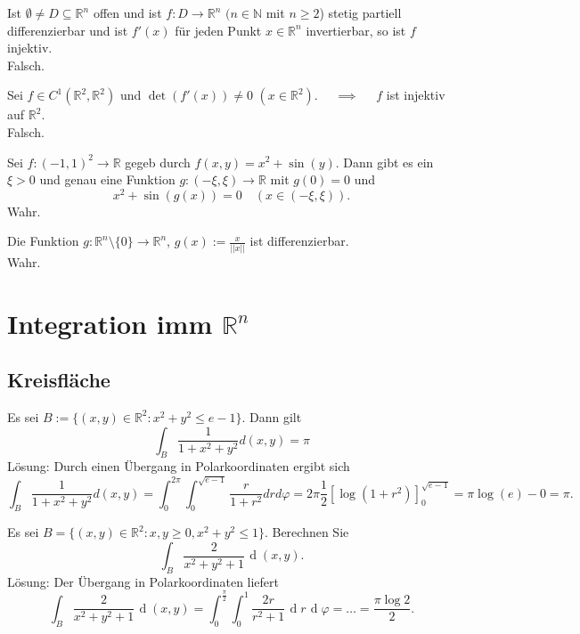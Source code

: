 \documentclass[parskip=full]{scrartcl}
\DeclareMathOperator{\diff}{\mathop{}\!\mathrm{d}}
\begin{document}
Ist $\emptyset \neq D \subseteq \mathbb{R}^n$ offen und ist $f : D \to \mathbb{R}^n$ $(n \in \mathbb{N}$ mit $n \geq 2$) stetig partiell differenzierbar und ist $f'(x)$ für jeden Punkt $x \in \mathbb{R}^n$ invertierbar, so ist $f$ injektiv.\\
Falsch.

Sei $f \in C^1(\mathbb{R}^2, \mathbb{R}^2)$ und $\det(f'(x)) \neq 0$ $(x \in \mathbb{R}^2)$. $\quad \implies \quad$ $f$ ist injektiv auf $\mathbb{R}^2$.\\
Falsch.

Sei $f : (-1,1)^2 \to \mathbb{R}$ gegeb durch $f(x,y) = x^2 + \sin(y)$.
Dann gibt es ein $\xi > 0$ und genau eine Funktion $g : (-\xi, \xi) \to \mathbb{R}$ mit $g(0) = 0$ und
\begin{displaymath}
  x^2 + \sin(g(x)) = 0 \quad (x \in (-\xi, \xi)).
\end{displaymath}
Wahr.

Die Funktion $g : \mathbb{R}^n \setminus \{0\} \to \mathbb{R}^n$, $g(x) := \frac{x}{||x||}$ ist differenzierbar.\\
Wahr.

\section{Integration imm $\mathbb{R}^n$}
\subsection{Kreisfläche}
Es sei $B:= \{(x,y) \in \mathbb{R}^2 : x^2 + y^2 \leq e - 1\}$.
Dann gilt
\begin{displaymath}
  \int_{B} \frac{1}{1 + x^2 + y^2}d(x,y) = \pi
\end{displaymath}
Lösung:
Durch einen Übergang in Polarkoordinaten ergibt sich
\begin{displaymath}
  \int_{B} \frac{1}{1 + x^2 + y^2} d(x,y) = \int_{0}^{2\pi} \int_{0}^{\sqrt{e - 1}} \frac{r}{1 + r^2} drd\varphi = 2\pi \frac{1}{2}[\log(1 + r^2)]_{0}^{\sqrt{e-1}} = \pi \log(e) - 0 = \pi.
\end{displaymath}

Es sei $B = \{(x,y) \in \mathbb{R}^2 : x,y \geq 0, x^2 + y^2 \leq 1\}$.
Berechnen Sie
\begin{displaymath}
  \int_B \frac{2}{x^2 + y^2 + 1} \diff (x,y).
\end{displaymath}
Lösung:
Der Übergang in Polarkoordinaten liefert
\begin{displaymath}
  \int_B \frac{2}{x^2 + y^2 + 1} \diff (x,y) = \int_0^{\frac{\pi}{2}} \int_0^1 \frac{2r}{r^2 + 1} \diff r \diff \varphi = \dots = \frac{\pi \log 2}{2}.
\end{displaymath}
\end{document}
